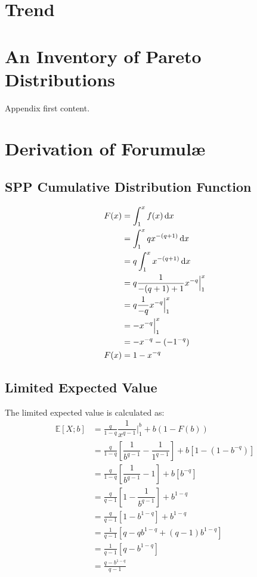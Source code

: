 \documentclass[]{article} %
\begin{document}
\section{Trend}

\newpage
\appendix
\appendixpage

\section{An Inventory of Pareto Distributions}\label{ParetoInventory}
Appendix first content.
\section{Derivation of Forumul\ae}
\subsection{SPP Cumulative Distribution Function}\label{ParetoF}
\begin{align}
	F(x) &= \int_{1}^{x} f(x) \operatorname{d \!} x \nonumber\\
		&= \int_{1}^{x}qx^{-(q+1)} \operatorname{d \!} x\nonumber\\
		&= q \int_{1}^{x}x^{-(q+1)} \operatorname{d \!} x\nonumber\\
		&= q \frac{1}{-(q+1)+1} x^{-q} \Big|_{1}^{x}\nonumber\\
		&=  q \frac{1}{-q} x^{-q} \Big|_{1}^{x}\nonumber\\
		&=  - x^{-q}\Big|_{1}^{x}\nonumber\\
		&= -x^{-q} - (-1^{-q})\nonumber\\
	 F(x) &=  1 - x^{-q}
\end{align}
\subsection{Limited Expected Value}\label{ParetoLEV}
The limited expected value is calculated as:
\begin{align}
	\mathbb{E}[X;b] 	&= \frac{q}{1-q} \dfrac{1}{x^{q-1}} \Big|_{1}^{b} + b  (1-F(b))\nonumber\\
 	&=  \frac{q}{1-q} \left[ \dfrac{1}{b^{q-1}} - \dfrac{1}{1^{q-1}}\right]+  b  \left[1-(1-b^{-q})\right]\nonumber\\
 	&=  \frac{q}{1-q} \left[ \dfrac{1}{b^{q-1}} - 1\right]+  b  \left[b^{-q}\right]\nonumber\\
 	&=  \frac{q}{q-1} \left[1 - \dfrac{1}{b^{q-1}}\right]+ b^{1-q}\nonumber\\
 	&=  \frac{q}{q-1} \left[1 - b^{1-q}\right]+b^{1-q}\\ %
 	&=  \frac{1}{q-1} \left[q - qb^{1-q} + (q-1)b^{1-q}\right]\nonumber\\
 	&=  \frac{1}{q-1} \left[q - b^{1-q}\right]\nonumber\\
 	&=	\frac{q - b^{1-q}}{q-1}
 \end{align}
 


\end{document}
